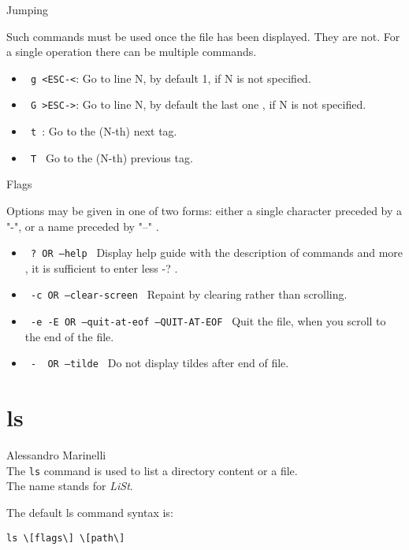 \documentclass[hidelinks,12pt,a4paper,numbers=enddot]{scrartcl}
\begin{document}
Jumping



Such commands must be used once the file has been displayed.
They are not. For a single operation there can be multiple commands. 

\begin{itemize}
    \item \texttt{  g  \textless   ESC-\textless    }:
        Go to line N, by default 1, if N is not specified.
    \item \texttt{ G  \textgreater   ESC-\textgreater  }:
        Go to line N, by default the last one , if N is not specified.
    \item \texttt{  t }:
        Go to the (N-th) next tag. 
    \item \texttt{ T }
        Go to the (N-th) previous tag.
\end{itemize}

Flags

Options may be given in one of two forms: either a single
character preceded by a "-", or a name preceded by "--" .

\begin{itemize}
  \item \texttt{ ?    OR    --help }
    Display help guide with the description of commands and more , it is sufficient to enter less -? .
  \item \texttt{ -c  OR   --clear-screen }
    Repaint by clearing rather than scrolling.
  \item \texttt{ -e  -E  OR  --quit-at-eof  --QUIT-AT-EOF }
    Quit the file, when you scroll to the end of the file.
  \item \texttt{  -~  OR  --tilde }
    Do not display tildes after end of file. 
\end{itemize}

\section{ls}


\large Alessandro Marinelli \normalsize\\


The \texttt{ls} command is used to list a directory content or a file.\\
The name stands for \emph{LiSt}.

The default ls command syntax is:

\begin{verbatim}
ls \[flags\] \[path\]
\end{verbatim}
\end{document}
